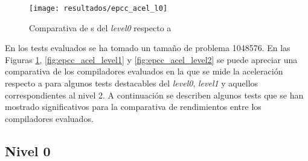 \begin{figure}[!tbh]
   \centering
   \texttt{[image: resultados/epcc\_acel\_l0]}
   \caption{Comparativa de \benchmark{}s del \textit{level0} respecto a \PGI{}}
   \label{fig:epcc_acel_level0}
\end{figure}

En los tests evaluados se ha tomado un tamaño de problema 1048576.
En las Figuras \ref{fig:epcc_acel_level0}, \ref{fig:epcc_acel_level1} y 
\ref{fig:epcc_acel_level2} se puede apreciar una comparativa de los 
compiladores evaluados en la 
que se mide la aceleración respecto a \PGI{} para algunos tests destacables del 
\textit{level0}, \textit{level1} y aquellos correspondientes al nivel 2. 
A continuación se describen algunos tests que se han mostrado significativos para la 
comparativa de rendimientos entre los compiladores evaluados. 

\subsection{Nivel 0}
\label{subsec:level0}

